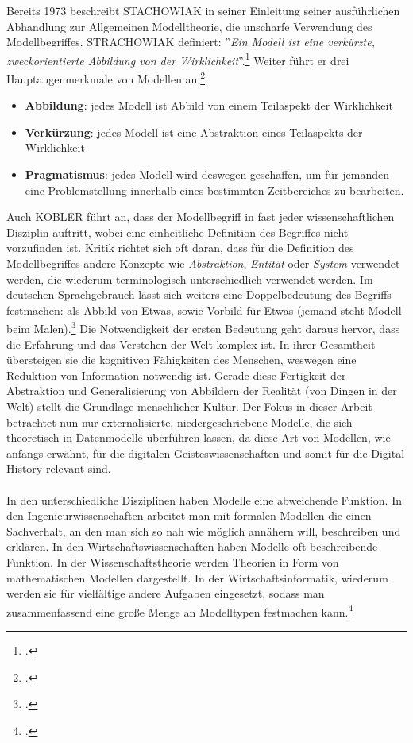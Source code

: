 \documentclass[12pt,a4paper]{article}
\begin{document}
Bereits 1973 beschreibt STACHOWIAK in seiner Einleitung seiner ausführlichen Abhandlung zur Allgemeinen Modelltheorie, die unscharfe Verwendung des Modellbegriffes. STRACHOWIAK definiert: ''\textit{Ein Modell ist eine verkürzte, zweckorientierte Abbildung von der Wirklichkeit}''.\footcite[Vgl.][S.]{stachowiak1973allgemeine} Weiter führt er drei Hauptaugenmerkmale von Modellen an:\footcite[Vgl.][S.131–133]{stachowiak1973allgemeine}
\begin{itemize}
\item \textbf{Abbildung}: jedes Modell ist Abbild von einem Teilaspekt der Wirklichkeit
\item \textbf{Verkürzung}: jedes Modell ist eine Abstraktion eines Teilaspekts der Wirklichkeit
\item \textbf{Pragmatismus}: jedes Modell wird deswegen geschaffen, um für jemanden eine Problemstellung innerhalb eines bestimmten Zeitbereiches zu bearbeiten.
\end{itemize}
Auch KOBLER führt an, dass der Modellbegriff in fast jeder wissenschaftlichen Disziplin auftritt, wobei eine einheitliche Definition des Begriffes nicht vorzufinden ist. Kritik richtet sich oft daran, dass für die Definition des Modellbegriffes andere Konzepte wie \textit{Abstraktion}, \textit{Entität} oder \textit{System} verwendet werden, die wiederum terminologisch unterschiedlich verwendet werden. Im deutschen Sprachgebrauch lässt sich weiters eine Doppelbedeutung des Begriffs festmachen: als Abbild von Etwas, sowie Vorbild für Etwas (jemand steht Modell beim Malen).\footcite[][S.129]{stachowiak1973allgemeine} Die Notwendigkeit der ersten Bedeutung geht daraus hervor, dass die Erfahrung und das Verstehen der Welt komplex ist. In ihrer Gesamtheit übersteigen sie die kognitiven Fähigkeiten des Menschen, weswegen eine Reduktion von Information notwendig ist. Gerade diese Fertigkeit der Abstraktion und Generalisierung von Abbildern der Realität (von Dingen in der Welt) stellt die Grundlage menschlicher Kultur. Der Fokus in dieser Arbeit betrachtet nun nur externalisierte, niedergeschriebene Modelle, die sich theoretisch in Datenmodelle überführen lassen, da diese Art von Modellen, wie anfangs erwähnt, für die digitalen Geisteswissenschaften und somit für die Digital History relevant sind.
\\
\\
In den unterschiedliche Disziplinen haben Modelle eine abweichende Funktion. In den Ingenieurwissenschaften arbeitet man mit formalen Modellen die einen Sachverhalt, an den man sich so nah wie möglich annähern will, beschreiben und erklären. In den Wirtschaftswissenschaften haben Modelle oft beschreibende Funktion. In der Wissenschaftstheorie werden Theorien in Form von mathematischen Modellen dargestellt. In der Wirtschaftsinformatik, wiederum werden sie für vielfältige andere Aufgaben eingesetzt, sodass man zusammenfassend eine große Menge an Modelltypen festmachen kann.\footcite[][S.41-44]{kobler2010qualitat}
\end{document}
